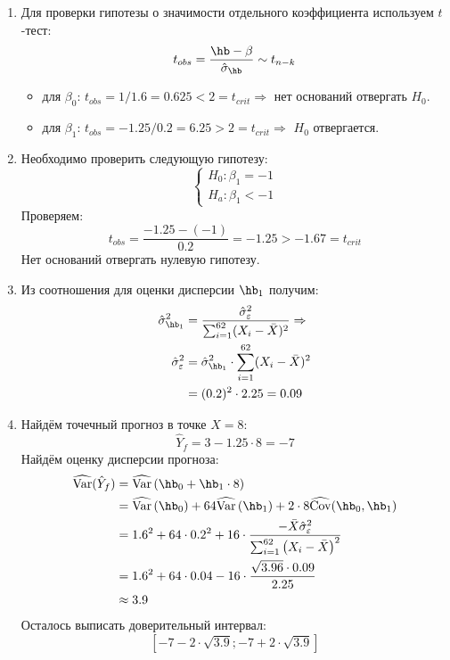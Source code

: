 \begin{enumerate}
\begin{enumerate}
\item Для проверки гипотезы о значимости отдельного коэффициента используем $t$-тест:
\[
t_{obs} = \frac{\hb - \beta}{\hat{\sigma}_{\hb}} \sim t_{n-k}
\]
\begin{itemize}
\item для $\beta_0$: $t_{obs} = 1 / 1.6 = 0.625 < 2 = t_{crit} \Rightarrow$
нет оснований отвергать $H_0$.
\item для $\beta_1$: $t_{obs} = -1.25 / 0.2 = 6.25 > 2 = t_{crit} \Rightarrow$
$H_0$ отвергается.
\end{itemize}
\item Необходимо проверить следующую гипотезу:
\[
\begin{cases}
H_0: \beta_1 = -1 \\
H_a: \beta_1 < -1
\end{cases}
\]
Проверяем:
\[
t_{obs} = \frac{-1.25 - (-1)}{0.2} = -1.25 > -1.67 = t_{crit}
\]
Нет оснований отвергать нулевую гипотезу.
\item Из соотношения для оценки дисперсии $\hb_1$ получим:
\begin{align*}
\hat{\sigma}^2_{\hb_1} &= \frac{\hat{\sigma}^2_{\varepsilon}}{\sum_{i=1}^{62}(X_i - \bar X)^2} \Rightarrow \\
\hat{\sigma}^2_{\varepsilon} &= \hat{\sigma}^2_{\hb_1} \cdot \sum_{i=1}^{62}(X_i - \bar X)^2 \\
&= (0.2)^2 \cdot 2.25 = 0.09
\end{align*}
\item Найдём точечный прогноз в точке $X = 8$:
\[
\hat Y_f = 3 - 1.25 \cdot 8 = -7
\]
Найдём оценку дисперсии прогноза:
\begin{align*}
\widehat{\Var}(\hat Y_f) &= \widehat{\Var} \left(\hb_0 + \hb_1 \cdot 8 \right) \\
&= \widehat{\Var} \left(\hb_0\right) + 64 \widehat{\Var} \left(\hb_1 \right) + 2 \cdot 8 \widehat{\Cov}(\hb_0, \hb_1) \\
&= 1.6^2 + 64 \cdot 0.2^2 + 16 \cdot \frac{-\bar X \hat{\sigma}^2_{\varepsilon}}{\sum_{i=1}^{62}\left(X_i - \bar X\right)^2} \\
&= 1.6^2 + 64 \cdot 0.04 - 16 \cdot \frac{\sqrt{3.96} \cdot 0.09}{2.25} \\
&\approx 3.9
\end{align*}
Осталось выписать доверительный интервал:
\[
\left[-7 -2 \cdot \sqrt{3.9}; -7 + 2 \cdot \sqrt{3.9} \right]
\]
\end{enumerate}
\end{enumerate}


